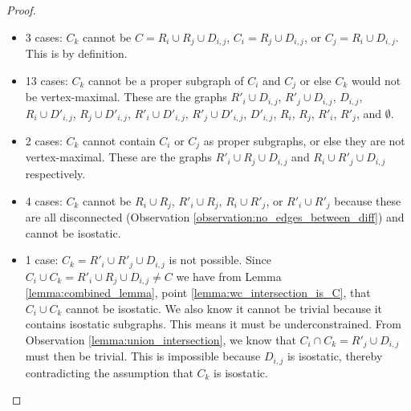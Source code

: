 \begin{proof}



    \newcommand{\inducedOnC}[1]{#1}

    \begin{itemize}
        \item 3 cases: $C_k$ cannot be $C=\inducedOnC{R_i\cup R_j\cup D_{i,j}}$, $C_i=\inducedOnC{R_j\cup D_{i,j}}$, or $C_j=\inducedOnC{R_i\cup D_{i,j}}$. This is by definition.

        \item 13 cases: $C_k$ cannot be a proper subgraph of $C_i$ and $C_j$ or else $C_k$ would not be vertex-maximal. These are the graphs $\inducedOnC{R'_i\cup D_{i,j}}$, $\inducedOnC{R'_j\cup D_{i,j}}$, $\inducedOnC{ D_{i,j}}$, $\inducedOnC{R_i\cup D'_{i,j}}$, $\inducedOnC{R_j\cup D'_{i,j}}$, $\inducedOnC{R'_i\cup D'_{i,j}}$, $\inducedOnC{R'_j\cup D'_{i,j}}$, $\inducedOnC{ D'_{i,j}}$, $\inducedOnC{R_i}$, $\inducedOnC{R_j}$, $\inducedOnC{R'_i}$, $\inducedOnC{R'_j}$, and $\inducedOnC{\emptyset}$.

        \item 2 cases: $C_k$ cannot contain $C_i$ or $C_j$ as proper subgraphs, or else they are not vertex-maximal. These are the graphs $\inducedOnC{R'_i\cup R_j\cup D_{i,j}}$ and $\inducedOnC{R_i\cup R'_j\cup D_{i,j}}$ respectively.

        \item 4 cases: \usestwod $C_k$ cannot be $\inducedOnC{R_i\cup R_j}$, $\inducedOnC{R'_i\cup R_j}$, $\inducedOnC{R_i\cup R'_j}$, or $\inducedOnC{R'_i\cup R'_j}$ because these are all disconnected (Observation \ref{observation:no_edges_between_diff}) and cannot be isostatic.

        \item 1 case: $C_k=\inducedOnC{R'_i\cup R'_j\cup D_{i,j}}$ is not possible. Since $C_i\cup C_k = \inducedOnC{R'_i\cup R_j\cup D_{i,j}}\neq C$ we have from Lemma \ref{lemma:combined_lemma}, point \ref{lemma:wc_intersection_is_C}, that $C_i\cup C_k$ cannot be isostatic. We also know it cannot be trivial because it contains isostatic subgraphs. This means it must be underconstrained. From Observation \ref{lemma:union_intersection}, we know that $C_i\cap C_k=\inducedOnC{R'_j\cup D_{i,j}}$ must then be trivial. This is impossible because $D_{i,j}$ is isostatic, thereby contradicting the assumption that $C_k$ is isostatic.


\end{itemize}
\end{proof}
